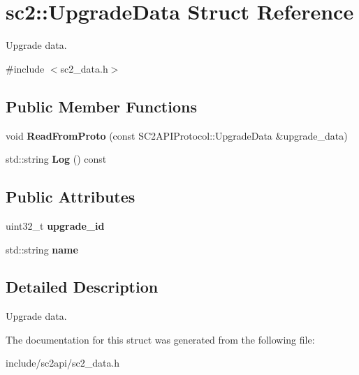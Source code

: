 \hypertarget{structsc2_1_1_upgrade_data}{}\section{sc2\+:\+:Upgrade\+Data Struct Reference}
\label{structsc2_1_1_upgrade_data}


Upgrade data.  




{\ttfamily \#include $<$sc2\+\_\+data.\+h$>$}

\subsection*{Public Member Functions}
\begin{DoxyCompactItemize}
\item 
\mbox{\label{structsc2_1_1_upgrade_data_a14c5db44ff8de245a4cd01592c3e6eeb}} 
void {\bfseries Read\+From\+Proto} (const S\+C2\+A\+P\+I\+Protocol\+::\+Upgrade\+Data \&upgrade\+\_\+data)
\item 
\mbox{\label{structsc2_1_1_upgrade_data_ab9641667d3a1ba0bb61ebd892a3fa8a5}} 
std\+::string {\bfseries Log} () const
\end{DoxyCompactItemize}
\subsection*{Public Attributes}
\begin{DoxyCompactItemize}
\item 
\mbox{\label{structsc2_1_1_upgrade_data_a029e671b0ca85d874b3723cae5f9b9ef}} 
uint32\+\_\+t {\bfseries upgrade\+\_\+id}
\item 
\mbox{\label{structsc2_1_1_upgrade_data_a8d8a126e4bee8c434bad896d3ac2c9be}} 
std\+::string {\bfseries name}
\end{DoxyCompactItemize}


\subsection{Detailed Description}
Upgrade data. 

The documentation for this struct was generated from the following file\+:\begin{DoxyCompactItemize}
\item 
include/sc2api/sc2\+\_\+data.\+h\end{DoxyCompactItemize}

